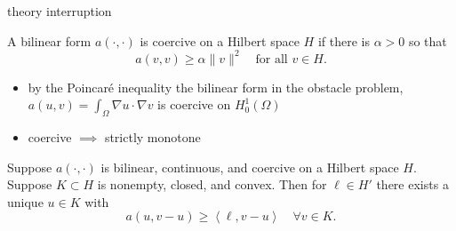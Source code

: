 \documentclass[aspectratio=169,10pt]{beamer}
\newcommand{\ip}[2]{\left\langle #1, #2 \right\rangle}
\begin{document}
\begin{frame}{theory interruption}

\begin{definition}
A bilinear form $a(\cdot,\cdot)$ is \alert{coercive} on a Hilbert space $H$ if there is $\alpha>0$ so that
	$$a(v,v) \ge \alpha \|v\|^2 \quad \text{for all } v\in H.$$
\end{definition}

\begin{itemize}
\item by the Poincar\'e inequality the bilinear form in the obstacle problem, $a(u,v) = \int_\Omega \nabla u \cdot \nabla v$ is coercive on $H_0^1(\Omega)$
\item coercive $\implies$ strictly monotone
\end{itemize}

\begin{theorem}
Suppose $a(\cdot,\cdot)$ is bilinear, continuous, and coercive on a Hilbert space $H$.  Suppose $K \subset H$ is nonempty, closed, and convex.  Then for $\ell\in H'$ there exists a unique $u\in K$ with
    $$a(u,v-u)\ge \ip{\ell}{v-u} \quad\forall v\in K.$$
\end{theorem}

\end{frame}
\end{document}
